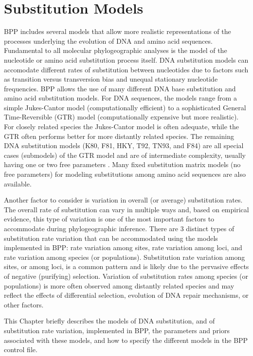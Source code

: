 \documentclass{book}
\numberwithin{equation}{section} \renewcommand{\baselinestretch}{0.55}
\begin{document}
\chapter{Substitution Models} \label{substitutions}
BPP includes several models that allow more realistic representations
of the processes underlying the evolution of DNA and amino acid
sequences. Fundamental to all molecular phylogeographic analyses is
the model of the nucleotide or amino acid substitution process
itself. DNA substitution models can accomodate different rates of
substitution between nucleotides due to factors such as transition
versus transversion bias and unequal stationary nucleotide
frequencies.  BPP allows the use of many different DNA base substitution
and amino acid substitution models. For DNA sequences, the models
range from a simple Jukes-Cantor model (computationally efficient) to a sophisticated General
Time-Reversible (GTR) model (computationally expensive but more
realistic).  For closely related species the Jukes-Cantor model is
often adequate, while the GTR often performs better for more distantly
related species. The remaining DNA substitution models (K80, F81,
HKY, T92, TN93, and F84) are all special cases (submodels) of the GTR model
and are of intermediate complexity, usually having one or two free
parameters \citep[see][]{Yang2014b}. Many fixed substitution matrix
models (no free parameters) for modeling substitutions among amino
acid sequences are also available. 

Another factor to consider is variation in overall (or average)
substitution rates.  The overall rate of substitution can vary in
multiple ways and, based on empirical evidence, this type of variation
is one of the most important factors to accommodate during
phylogeographic inference.  There are 3 distinct types of substitution
rate variation that can be accommodated using the models implemented
in BPP: rate variation among sites, rate variation among loci, and
rate variation among species (or populations). Substitution rate
variation among sites, or among loci, is a common pattern and
is likely due to the pervasive effects of negative (purifying)
selection. Variation of substitution rates among species (or
populations) is more often observed among distantly related species
and may reflect the effects of differential selection, evolution of
DNA repair mechanisms, or other factors.

This Chapter briefly describes the models of DNA substitution, and of
substitution rate variation, implemented in BPP, the parameters and
priors associated with these models, and how to specify the different
models in the BPP control file.
\end{document}
